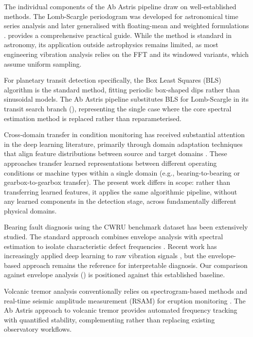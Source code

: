 \documentclass[11pt,a4paper]{article}
\begin{document}
The individual components of the Ab Astris pipeline draw on well-established methods. The Lomb-Scargle periodogram was developed for astronomical time series analysis \citep{Lomb1976,Scargle1982} and later generalised with floating-mean and weighted formulations \citep{Zechmeister2009}. \citet{VanderPlas2018} provides a comprehensive practical guide. While the method is standard in astronomy, its application outside astrophysics remains limited, as most engineering vibration analysis relies on the FFT and its windowed variants, which assume uniform sampling.

For planetary transit detection specifically, the Box Least Squares (BLS) algorithm \citep{Kovacs2002} is the standard method, fitting periodic box-shaped dips rather than sinusoidal models. The Ab Astris pipeline substitutes BLS for Lomb-Scargle in its transit search branch (), representing the single case where the core spectral estimation method is replaced rather than reparameterised.

Cross-domain transfer in condition monitoring has received substantial attention in the deep learning literature, primarily through domain adaptation techniques that align feature distributions between source and target domains \citep{Li2020,Zhao2021}. These approaches transfer learned representations between different operating conditions or machine types within a single domain (e.g., bearing-to-bearing or gearbox-to-gearbox transfer). The present work differs in scope: rather than transferring learned features, it applies the same algorithmic pipeline, without any learned components in the detection stage, across fundamentally different physical domains.

Bearing fault diagnosis using the CWRU benchmark dataset has been extensively studied. The standard approach combines envelope analysis with spectral estimation to isolate characteristic defect frequencies \citep{Randall2011}. Recent work has increasingly applied deep learning to raw vibration signals \citep{Zhang2018}, but the envelope-based approach remains the reference for interpretable diagnosis. Our comparison against envelope analysis () is positioned against this established baseline.

Volcanic tremor analysis conventionally relies on spectrogram-based methods and real-time seismic amplitude measurement (RSAM) for eruption monitoring \citep{McNutt1996}. The Ab Astris approach to volcanic tremor provides automated frequency tracking with quantified stability, complementing rather than replacing existing observatory workflows.
\end{document}
